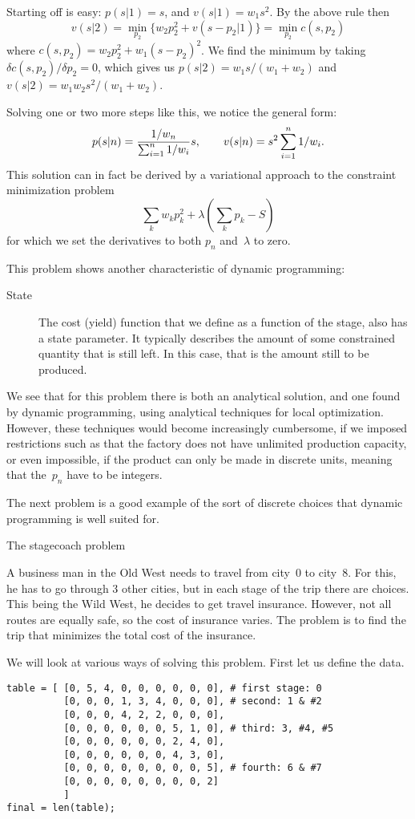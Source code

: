 Starting off is easy: $p(s|1)=s$, and $v(s|1)=w_1s^2$. By the above rule
then
\[ v(s|2)=\min_{p_2}\{w_2p_2^2+v(s-p_2|1)\}=\min_{p_2}c(s,p_2) \]
where $c(s,p_2)=w_2p_2^2+w_1(s-p_2)^2$. We find the minimum by
taking~$\delta c(s,p_2)/\delta p_2=0$, which gives us
$p(s|2)=w_1s/(w_1+w_2)$ and $v(s|2)=w_1w_2s^2/(w_1+w_2)$.

Solving one or two more steps like this, we notice the general form:
\[ p(s|n)={1/w_n\over \sum_{i=1}^n 1/w_i}s,\qquad
    v(s|n)=s^2\sum_{i=1}^n1/w_i.\]
This solution can in fact be derived by a variational approach to the
constraint minimization problem
\[ \sum_kw_kp_k^2+\lambda(\sum_kp_k-S) \]
for which we set the derivatives to both $p_n$ and~$\lambda$ to zero.

This problem shows another characteristic of dynamic programming:
\begin{description}
\item[State] The cost (yield) function that we define as a function of
  the stage, also has a state parameter. It typically describes the
  amount of some constrained quantity that is still left. In this
  case, that is the amount still to be produced.
\end{description}

We see that for this problem there is both an analytical solution, and
one found by dynamic programming, using analytical techniques for
local optimization. However, these techniques would become
increasingly cumbersome, if we imposed restrictions such as that the
factory does not have unlimited production capacity, or even
impossible, if the product can only be made in discrete units, meaning
that the~$p_n$ have to be integers.

The next problem is a good example of the sort of discrete choices
that dynamic programming is well suited for.

 {The stagecoach problem}

A business man in the Old West needs to travel from city~0 to
city~8. For this, he has to go through 3 other cities, but in each
stage of the trip there are choices. This being the Wild West, he
decides to get travel insurance. However, not all routes are
equally safe, so the cost of insurance varies. The problem is to find
the trip that minimizes the total cost of the insurance.


We will look at various ways of solving this problem. First
let us define the data.
\begin{verbatim}
table = [ [0, 5, 4, 0, 0, 0, 0, 0, 0], # first stage: 0
          [0, 0, 0, 1, 3, 4, 0, 0, 0], # second: 1 & #2
          [0, 0, 0, 4, 2, 2, 0, 0, 0],
          [0, 0, 0, 0, 0, 0, 5, 1, 0], # third: 3, #4, #5
          [0, 0, 0, 0, 0, 0, 2, 4, 0],
          [0, 0, 0, 0, 0, 0, 4, 3, 0],
          [0, 0, 0, 0, 0, 0, 0, 0, 5], # fourth: 6 & #7
          [0, 0, 0, 0, 0, 0, 0, 0, 2]
          ]
final = len(table); 
\end{verbatim}

